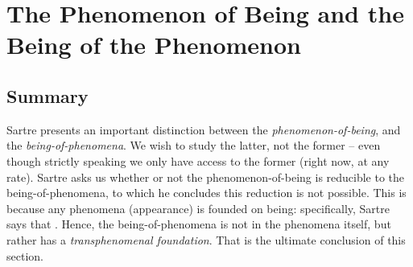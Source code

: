 \section{The Phenomenon of Being and the Being of the Phenomenon}

\subsection*{Summary}
Sartre presents an important distinction between the \emph{phenomenon-of-being}, and the \emph{being-of-phenomena}. We wish to study the latter, not the former -- even though strictly speaking we only have access to the former (right now, at any rate). Sartre asks us whether or not the phenomenon-of-being is reducible to the being-of-phenomena, to which he concludes this reduction is not possible. This is because any phenomena (appearance) is founded on being: specifically, Sartre says that .
Hence, the being-of-phenomena is not in the phenomena itself, but rather has a \emph{transphenomenal foundation}. That is the ultimate conclusion of this section.

